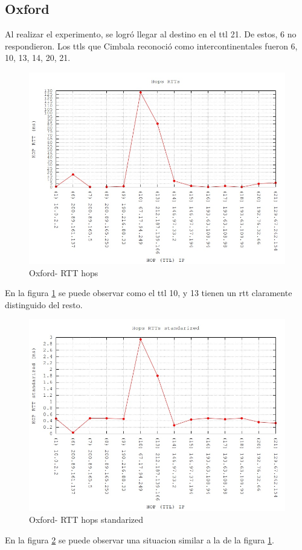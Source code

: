\subsection{Oxford}

Al realizar el experimento, se logró llegar al destino en el ttl 21. De estos, 6 no respondieron. Los ttls que Cimbala reconoció como intercontinentales fueron 6, 10, 13, 14, 20, 21.

\begin{figure}[h!]
  \centering
    \includegraphics[scale=0.6]{imagenes/oxford-graficos/traceroute-oxford.jpg}
  \caption{Oxford- RTT hops}
  \label{fig:4}
\end{figure}

En la figura \ref{fig:4} se puede observar como el ttl 10, y 13 tienen un rtt claramente distinguido del resto.

\begin{figure}[h!]
  \centering
    \includegraphics[scale=0.6]{imagenes/oxford-graficos/traceroute-oxford-standarized.jpg}
  \caption{Oxford- RTT hops standarized}
  \label{fig:5}
\end{figure}

En la figura \ref{fig:5} se puede observar una situacion similar a la de la figura \ref{fig:4}.


